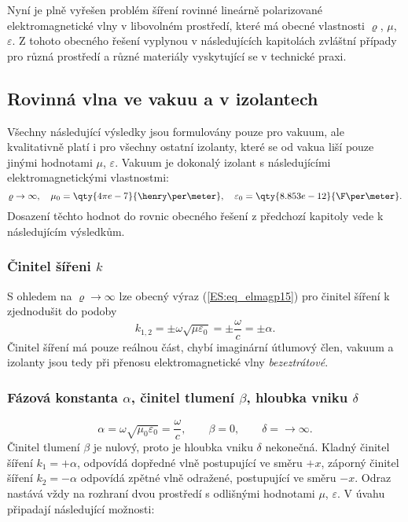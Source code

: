         Nyní je plně vyřešen problém šíření rovinné lineárně polarizované elektromagnetické vlny v 
        libovolném prostředí, které má obecné vlastnosti \(\varrho\), \(\mu\), \(\varepsilon\). Z 
        tohoto obecného řešení vyplynou v následujících kapitolách zvláštní případy pro různá 
        prostředí a různé materiály vyskytující se v technické praxi.

    \subsection{Rovinná vlna ve vakuu a v izolantech}
      Všechny následující výsledky jsou formulovány pouze pro vakuum, ale kvalitativně platí i 
      pro všechny ostatní izolanty, které se od vakua liší pouze jinými hodnotami \(\mu\), 
      \(\varepsilon\). Vakuum je dokonalý izolant s následujícími elektromagnetickými 
      vlastnostmi:
      \begin{equation}\label{ES:eq_elmagp35}
        \varrho\rightarrow\infty, \quad 
        \mu_0         =  \qty{4\pi e-7}{\henry\per\meter}, \quad
        \varepsilon_0 =  \qty{8.853e-12}{\F\per\meter}.
      \end{equation}
      Dosazení těchto hodnot do rovnic obecného řešení z předchozí kapitoly vede k následujícím 
      výsledkům.
 
      \subsubsection{Činitel šířeni \(k\)}
        S ohledem na \(\varrho\rightarrow\infty\) lze obecný výraz (\ref{ES:eq_elmagp15}) 
        pro činitel šíření k zjednodušit do podoby
        \begin{equation}\label{ES:eq_elmagp36}
          k_{1,2} = \pm\omega\sqrt{\mu\varepsilon_0} 
                  = \pm\frac{\omega}{c}
                  = \pm\alpha.
        \end{equation}
        Činitel šíření má pouze reálnou část, chybí imaginární útlumový člen, vakuum a izolanty 
        jsou tedy při přenosu elektromagnetické vlny \emph{bezeztrátové}.
           
      \subsubsection{Fázová konstanta \(\alpha\), činitel tlumení \(\beta\), hloubka 
                         vniku \(\delta\)}
        \begin{equation}\label{ES:eq_elmagp37}
          \alpha = \omega\sqrt{\mu_0\varepsilon_0} = \frac{\omega}{c}, \qquad 
          \beta  = 0,                                                  \qquad
           \delta = \rightarrow\infty.
        \end{equation}
        Činitel tlumení \(\beta\) je nulový, proto je hloubka vniku \(\delta\) nekonečná. Kladný 
        činitel šíření \(k_1 = +\alpha\), odpovídá dopředné vlně postupující ve směru \(+x\), 
        záporný činitel šíření \(k_2 = -\alpha\) odpovídá zpětné vlně odražené, postupující ve 
        směru \(-x\). Odraz nastává vždy na rozhraní dvou prostředí s odlišnými hodnotami \(\mu\), 
        \(\varepsilon\). V úvahu připadají následující možnosti:
        

